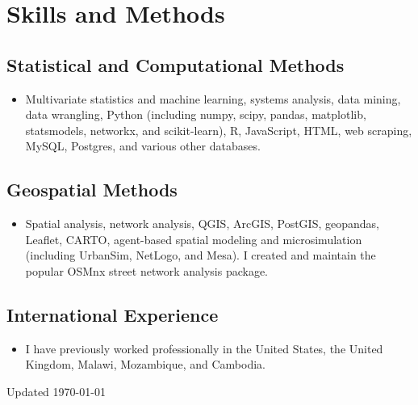 \documentclass{academiccv}
\begin{document}
\section*{Skills and Methods}

\subsection*{Statistical and Computational Methods}

\begin{itemize}
	\item Multivariate statistics and machine learning, systems analysis, data mining, data wrangling, Python (including numpy, scipy, pandas, matplotlib, statsmodels, networkx, and scikit-learn), R, JavaScript, HTML, web scraping, MySQL, Postgres, and various other databases.
\end{itemize}

\subsection*{Geospatial Methods}

\begin{itemize}
	\item Spatial analysis, network analysis, QGIS, ArcGIS, PostGIS, geopandas, Leaflet, CARTO, agent-based spatial modeling and microsimulation (including UrbanSim, NetLogo, and Mesa). I created and maintain the popular OSMnx street network analysis package.
\end{itemize}

\subsection*{International Experience}

\begin{itemize}
	\item I have previously worked professionally in the United States, the United Kingdom, Malawi, Mozambique, and Cambodia.
\end{itemize}



\begin{center}
\vspace{6em}
Updated \monthyeardate\today
\end{center}
\end{document}
